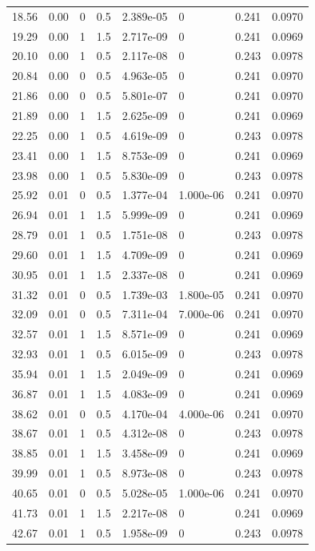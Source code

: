 \documentclass[preview]{standalone}
\begin{document}
{{\begin{tabular}{L{1.2cm}C{1.2cm} C{0.3cm}C{0.5cm} C{1.4cm}C{1.4cm} C{1.4cm}C{1.4cm}}
  18.56  &  0.00  & 0     & 0.5 &  2.389e-05  & 0  & 0.241 &  0.0970   \\ 
  19.29  &  0.00  & 1     & 1.5 &  2.717e-09  & 0  & 0.241 &  0.0969   \\ 
  20.10  &  0.00  & 1     & 0.5 &  2.117e-08  & 0  & 0.243 &  0.0978   \\ 
  20.84  &  0.00  & 0     & 0.5 &  4.963e-05  & 0  & 0.241 &  0.0970   \\ 
  21.86  &  0.00  & 0     & 0.5 &  5.801e-07  & 0  & 0.241 &  0.0970   \\ 
  21.89  &  0.00  & 1     & 1.5 &  2.625e-09  & 0  & 0.241 &  0.0969   \\ 
  22.25  &  0.00  & 1     & 0.5 &  4.619e-09  & 0  & 0.243 &  0.0978   \\ 
  23.41  &  0.00  & 1     & 1.5 &  8.753e-09  & 0  & 0.241 &  0.0969   \\ 
  23.98  &  0.00  & 1     & 0.5 &  5.830e-09  & 0  & 0.243 &  0.0978   \\ 
  25.92  &  0.01  & 0     & 0.5 &  1.377e-04  & 1.000e-06  & 0.241 &  0.0970   \\ 
  26.94  &  0.01  & 1     & 1.5 &  5.999e-09  & 0  & 0.241 &  0.0969   \\ 
  28.79  &  0.01  & 1     & 0.5 &  1.751e-08  & 0  & 0.243 &  0.0978   \\ 
  29.60  &  0.01  & 1     & 1.5 &  4.709e-09  & 0  & 0.241 &  0.0969   \\ 
  30.95  &  0.01  & 1     & 1.5 &  2.337e-08  & 0  & 0.241 &  0.0969   \\ 
  31.32  &  0.01  & 0     & 0.5 &  1.739e-03  & 1.800e-05  & 0.241 &  0.0970   \\ 
  32.09  &  0.01  & 0     & 0.5 &  7.311e-04  & 7.000e-06  & 0.241 &  0.0970   \\ 
  32.57  &  0.01  & 1     & 1.5 &  8.571e-09  & 0  & 0.241 &  0.0969   \\ 
  32.93  &  0.01  & 1     & 0.5 &  6.015e-09  & 0  & 0.243 &  0.0978   \\ 
  35.94  &  0.01  & 1     & 1.5 &  2.049e-09  & 0  & 0.241 &  0.0969   \\ 
  36.87  &  0.01  & 1     & 1.5 &  4.083e-09  & 0  & 0.241 &  0.0969   \\ 
  38.62  &  0.01  & 0     & 0.5 &  4.170e-04  & 4.000e-06  & 0.241 &  0.0970   \\ 
  38.67  &  0.01  & 1     & 0.5 &  4.312e-08  & 0  & 0.243 &  0.0978   \\ 
  38.85  &  0.01  & 1     & 1.5 &  3.458e-09  & 0  & 0.241 &  0.0969   \\ 
  39.99  &  0.01  & 1     & 0.5 &  8.973e-08  & 0  & 0.243 &  0.0978   \\ 
  40.65  &  0.01  & 0     & 0.5 &  5.028e-05  & 1.000e-06  & 0.241 &  0.0970   \\ 
  41.73  &  0.01  & 1     & 1.5 &  2.217e-08  & 0  & 0.241 &  0.0969   \\ 
  42.67  &  0.01  & 1     & 0.5 &  1.958e-09  & 0  & 0.243 &  0.0978   \\ 
\hline 
\end{tabular} 

}}
\end{document}
